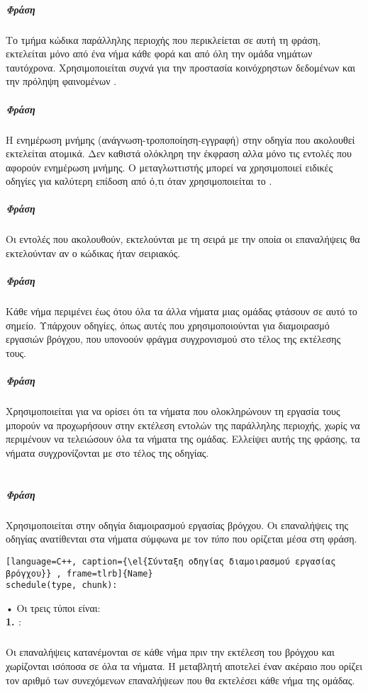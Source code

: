 \subparagraph{Φράση \emph{}}
\subparagraph{}
Το τμήμα κώδικα παράλληλης περιοχής που περικλείεται σε αυτή τη φράση, εκτελείται μόνο από ένα νήμα κάθε φορά και από όλη την ομάδα νημάτων ταυτόχρονα. Χρησιμοποιείται συχνά για την προστασία κοινόχρηστων δεδομένων και την πρόληψη φαινομένων \emph{}.

\subparagraph{Φράση \emph{}}
\subparagraph{}
H ενημέρωση μνήμης (ανάγνωση-τροποποίηση-εγγραφή) στην οδηγία που ακολουθεί εκτελείται ατομικά. Δεν καθιστά ολόκληρη την έκφραση \emph{} αλλα μόνο τις εντολές που αφορούν ενημέρωση μνήμης. Ο μεταγλωττιστής μπορεί να χρησιμοποιεί ειδικές οδηγίες \emph{} για καλύτερη επίδοση από ό,τι όταν χρησιμοποιείται το \emph{}.
      
\clearpage
\subparagraph{Φράση \emph{}}
\subparagraph{}
Οι εντολές που ακολουθούν, εκτελούνται με τη σειρά με την οποία οι επαναλήψεις θα εκτελούνταν αν ο κώδικας ήταν σειριακός.

\subparagraph{Φράση \emph{}}
\subparagraph{}
Kάθε νήμα περιμένει έως ότου όλα τα άλλα νήματα μιας ομάδας φτάσουν σε αυτό το σημείο. Υπάρχουν οδηγίες, όπως αυτές που χρησιμοποιούνται για διαμοιρασμό εργασιών βρόγχου, που υπονοούν φράγμα συγχρονισμού \emph{} στο τέλος της εκτέλεσης τους.

\subparagraph{Φράση \emph{}}
\subparagraph{}
Χρησιμοποιείται για να ορίσει ότι τα νήματα που ολοκληρώνουν τη εργασία τους μπορούν να προχωρήσουν στην εκτέλεση εντολών της παράλληλης περιοχής, χωρίς να περιμένουν να τελειώσουν όλα τα νήματα της ομάδας. Ελλείψει αυτής της φράσης, τα νήματα συγχρονίζονται με \emph{} στο τέλος της οδηγίας.
\ \\
\ \\
\subparagraph{Φράση \emph{}}
\subparagraph{}
Χρησιμοποιείται στην οδηγία διαμοιρασμού εργασίας βρόγχου. Οι επαναλήψεις της οδηγίας ανατίθενται στα νήματα σύμφωνα με τον \emph{τύπο} που ορίζεται μέσα στη φράση.
\begin{lstlisting}[language=C++, caption={\el{Σύνταξη οδηγίας διαμοιρασμού εργασίας βρόγχου}} , frame=tlrb]{Name}
schedule(type, chunk): 
\end{lstlisting}
\clearpage
    •  Οι τρεις τύποι \emph{} είναι\cite{jakacorner}:\\
      
\textbf{1. \emph{}}:
\subparagraph{}
Οι επαναλήψεις κατανέμονται σε κάθε νήμα πριν την εκτέλεση του βρόγχου και χωρίζονται ισόποσα σε όλα τα νήματα. Η μεταβλητή \emph{} αποτελεί έναν ακέραιο που ορίζει τον αριθμό των συνεχόμενων επαναλήψεων που θα εκτελέσει κάθε νήμα της ομάδας.

